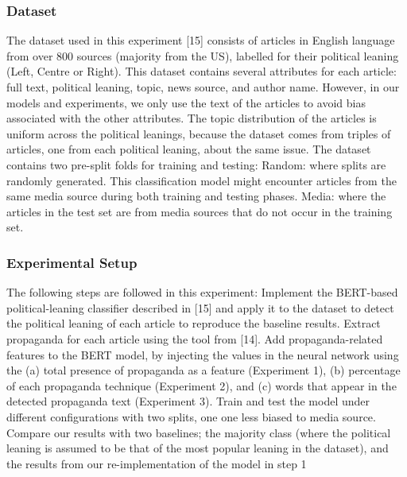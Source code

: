 \subsubsection{Dataset}
The dataset used in this experiment [15] consists of articles in English language from over 800 sources (majority from the US), labelled for their political leaning (Left, Centre or Right). This dataset contains several attributes for each article: full text, political leaning, topic, news source, and author name. However, in our models and experiments, we only use the text of the articles to avoid bias associated with the other attributes. The topic distribution of the articles is uniform across the political leanings, because the dataset comes from triples of articles, one from each political leaning, about the same issue. The dataset contains two pre-split folds for training and testing:
Random: where splits are randomly generated. This classification model might encounter articles from the same media source during both training and testing phases.
Media: where the articles in the test set are from media sources that do not occur in the training set.

\subsubsection{Experimental Setup}

The following steps are followed in this experiment:
 Implement the BERT-based political-leaning classifier described in [15] and apply it to the dataset to detect the political leaning of each article to reproduce the baseline results.
 Extract propaganda for each article using the tool from [14].
Add propaganda-related features to the BERT model, by injecting the values in the neural network using the (a) total presence of propaganda as a feature (Experiment 1), (b) percentage of each propaganda technique (Experiment 2), and (c) words that appear in the detected propaganda text (Experiment 3).
Train and test the model under different configurations with two splits, one   one less biased to media source.
Compare our results with two baselines; the majority class (where the political leaning is assumed to be that of the most popular leaning in the dataset), and the results from our re-implementation of the model in step 1

